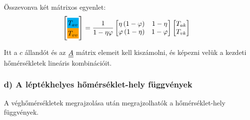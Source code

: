 Összevonva két mátrixos egyenlet:
\begin{equation}
	\label{equation:K71TM}
	\begin{bmatrix}
		\highlight{cyan}{T_{av}} \\
		\highlight{orange!75!yellow}{T_{vv}}
	\end{bmatrix}
	=
	\dfrac{1}{1 - \eta \varphi}
	\begin{bmatrix}
		\eta\left(1-\varphi\right) & 1-\eta \\
		\varphi\left(1-\eta\right) & 1-\varphi
	\end{bmatrix}
	\begin{bmatrix}
		T_{ak} \\
		T_{vk}
	\end{bmatrix}
\end{equation}

Itt a $c$ állandót és az $\mat{A}$ mátrix elemeit kell kiszámolni, és képezni velük a kezdeti hőmérsékletek lineáris kombinációit. 

\subsubsection*{d) A léptékhelyes hőmérséklet-hely függvények}
A véghőmérsékletek megrajzolása után megrajzolhatók a hőmérséklet-hely függvények.

